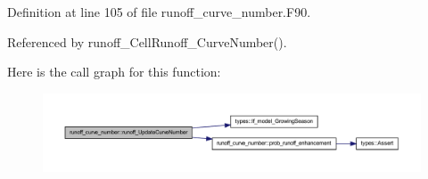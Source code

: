 Definition at line 105 of file runoff\_\-curve\_\-number.F90.



Referenced by runoff\_\-CellRunoff\_\-CurveNumber().



Here is the call graph for this function:\nopagebreak
\begin{figure}[H]
\begin{center}
\leavevmode
\includegraphics[width=400pt]{namespacerunoff__curve__number_aa67ff881b9c177ceae2d5f9d1326c2f4_cgraph}
\end{center}
\end{figure}


